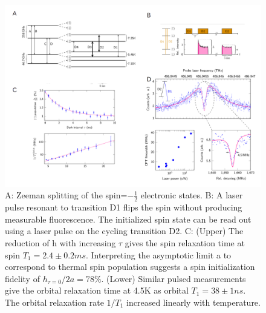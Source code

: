 \begin{figure}[h]
\centering
\includegraphics[width=1\linewidth]{Figures/pic/coherent}
\caption{A: Zeeman splitting of the spin=$-\frac{1}{2}$ electronic states. B: A laser pulse resonant to transition D1 flips the spin without producing measurable fluorescence. The initialized spin state can be read out using a laser pulse on the cycling transition D2. C: (Upper) The reduction of h with increasing $\tau$ gives the spin relaxation time at spin $T_{1} = 2.4 \pm 0.2ms$. Interpreting the asymptotic limit a to correspond to thermal spin population suggests a spin initialization fidelity of $h_{\tau=0}/2a = 78\%$. (Lower) Similar pulsed measurements give the orbital relaxation time at 4.5K as orbital $T_{1} = 38\pm1ns$. The orbital relaxation rate $1/T_{1}$ increased linearly with temperature. \citep{rogers_all-optical_2014}}
\label{fig:CPT}
\end{figure}


